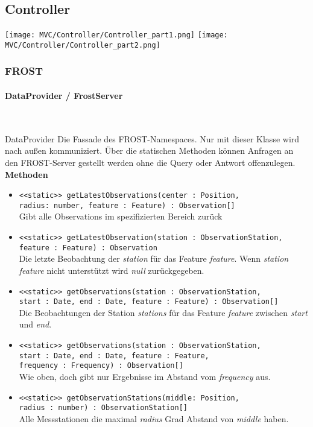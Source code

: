 \subsection{Controller}

\texttt{[image: MVC/Controller/Controller\_part1.png]}
\newpage
\texttt{[image: MVC/Controller/Controller\_part2.png]}

\subsubsection{FROST}

\paragraph{DataProvider / FrostServer}\mbox{}\\

\begin{Class}{DataProvider}
    Die Fassade des FROST-Namespaces. Nur mit dieser Klasse wird nach außen kommuniziert.
    Über die statischen Methoden können Anfragen an den FROST-Server gestellt werden ohne die Query oder Antwort offenzulegen.
    \textbf{Methoden}
    \begin{itemize}
        \item \texttt{<<static>> getLatestObservations(center : Position,
        \\ radius: number, feature : Feature) : Observation[]}
        \\Gibt alle Observations im spezifizierten Bereich zurück
        \item \texttt{<<static>> getLatestObservation(station : ObservationStation, feature : Feature) : Observation}
        \\ Die letzte Beobachtung der \emph{station} für das Feature \emph{feature}.
        Wenn \emph{station} \emph{feature} nicht unterstützt wird \emph{null} zurückgegeben.
        \item \texttt{<<static>> getObservations(station : ObservationStation,
        \\ start : Date, end : Date, feature : Feature) : Observation[]}
        \\ Die Beobachtungen der Station \emph{stations} für das Feature \emph{feature}
        zwischen \emph{start} und \emph{end}.
        \item \texttt{<<static>> getObservations(station : ObservationStation,
        \\ start : Date, end : Date, feature : Feature,
        \\ frequency : Frequency) : Observation[]}
        \\ Wie oben, doch gibt nur Ergebnisse im Abstand vom \emph{frequency} aus.
        \item \texttt{<<static>> getObservationStations(middle: Position,
        \\ radius : number) : ObservationStation[]}
        \\ Alle Messstationen die maximal \emph{radius} Grad Abstand von \emph{middle} haben.
    \end{itemize}
\end{Class}

